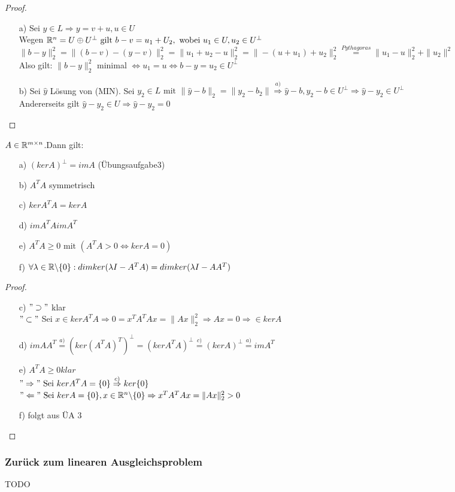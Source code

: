 \begin{proof}\hfill
\begin{itemize}
\item[a)] Sei $y \in L \Rightarrow y=v+u, u\in U$\\Wegen $\mathbb R^n=U \oplus U^{\perp} \text{ gilt } b-v=u_1+U_2, \text{ wobei } u_1\in U, u_2 \in U^{\perp}$\\
$\|b-y\|_2^{2} =\|(b-v)-(y-v)\|_2^{2}=\|u_1+u_2-u\|_2^{2}=\|-(u+u_1)+u_2\|_2^{2} \overset{Pythagoras}{=}\|u_1-u\|_2^{2} + \|u_2\|^{2}$\\
Also gilt: $\|b-y\|_2^{2}$ minimal $\Leftrightarrow u_1=u \Leftrightarrow b-y = u_2 \in U^{\perp}$\\
\item[b)] Sei $\hat{y}$ Lösung von (MIN). Sei $y_2 \in L \text{ mit }\|\hat{y}-b\|_2 =\|y_2-b_2\| \overset{a)}{\Rightarrow} \hat{y}-b,y_2-b \in U^{\perp} \Rightarrow \hat{y}-y_2 \in U^{\perp}$\\
Andererseits gilt $\hat{y}-y_2 \in U \Rightarrow \hat{y}-y_2=0$
\end{itemize}
\end{proof}
\begin{Satz}
$A \in \mathbb R^{m \times n}$.Dann gilt:\\\begin{itemize}
\item[a)]$(ker A)^{\perp} = im A$ (Übungsaufgabe3)
\item[b)]$A^TA$ symmetrisch
\item[c)]$ker A^TA = ker A$
\item[d)]$im A^TA im A^T$
\item[e)]$A^TA \ge 0 \text{ mit } (A^TA>0 \Leftrightarrow ker A = {0})$
\item[f)] $\forall \lambda \in \mathbb R\backslash\{0\}: dim ker(\lambda I-A^TA) = dim ker(\lambda I-AA^T)$
\end{itemize}
\end{Satz}
\begin{proof}\hfill
\begin{itemize}
\item[c)]$"\supset"$ klar\\
$" \subset" $ Sei $x \in ker A^TA \Rightarrow 0=x^TA^TAx=\|Ax\|_2^{2} \Rightarrow Ax=0 \Rightarrow \in ker A$
\item[d)]$im AA^T \overset{a)}{=} (ker(A^TA)^T)^{\perp} = (ker A^TA)^{\perp} \overset{c)}{=} (ker A)^{\perp} \overset{a)}{=} im A^T$
\item[e)]$A^TA\ge 0 klar$\\$" \Rightarrow"\text{ Sei } ker A^TA =\{0\} \overset{c)}{\Rightarrow}ker\{0\}$\\$"\Leftarrow" \text{ Sei } ker A=\{0\}, x\in \mathbb R^n\backslash\{0\} \Rightarrow x^TA^TAx = \|Ax\|_2^{2} > 0$
\item[f)] folgt aus ÜA 3
\end{itemize}
\end{proof}
\subsubsection{Zurück zum linearen Ausgleichsproblem}
TODO